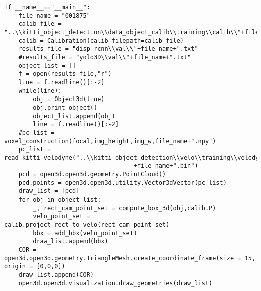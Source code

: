 \begin{verbatim}
if __name__=="__main__":
    file_name = "001875"
    calib_file = "..\\kitti_object_detection\\data_object_calib\\training\\calib\\"+file_name+".txt"
    calib = Calibration(calib_filepath=calib_file)
    results_file = "disp_rcnn\\val\\"+file_name+".txt"
    #results_file = "yolo3D\\val\\"+file_name+".txt"
    object_list = []
    f = open(results_file,"r")
    line = f.readline()[:-2]
    while(line):
        obj = Object3d(line)
        obj.print_object()
        object_list.append(obj)
        line = f.readline()[:-2]
    #pc_list = voxel_construction(focal,img_height,img_w,file_name+".npy")
    pc_list = read_kitti_velodyne("..\\kitti_object_detection\\velo\\training\\velodyne\\"
                                    +file_name+".bin")
    pcd = open3d.open3d.geometry.PointCloud()
    pcd.points = open3d.open3d.utility.Vector3dVector(pc_list)
    draw_list = [pcd]
    for obj in object_list:
        _, rect_cam_point_set = compute_box_3d(obj,calib.P)
        velo_point_set = calib.project_rect_to_velo(rect_cam_point_set)
        bbx = add_bbx(velo_point_set)
        draw_list.append(bbx)
    COR = open3d.open3d.geometry.TriangleMesh.create_coordinate_frame(size = 15, origin = [0,0,0])
    draw_list.append(COR)
    open3d.open3d.visualization.draw_geometries(draw_list)
\end{verbatim}
\newpage

